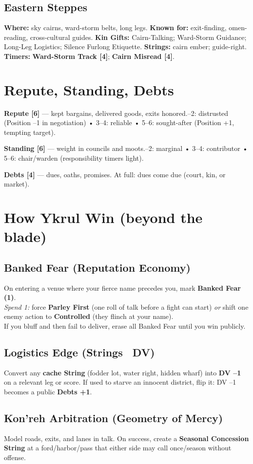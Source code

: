 \documentclass[11pt,letterpaper]{article}
\newcommand{\culture}[1]{\subsection*{#1}}
\newcommand{\timer}[2]{\textbf{#1 [#2]}}
\begin{document}
\culture{Eastern Steppes}
\textbf{Where:} sky cairns, ward-storm belts, long legs.\quad
\textbf{Known for:} exit-finding, omen-reading, cross-cultural guides.\quad
\textbf{Kin Gifts:} Cairn-Talking; Ward-Storm Guidance; Long-Leg Logistics; Silence Furlong Etiquette.\quad
\textbf{Strings:} cairn ember; guide-right.\quad
\textbf{Timers:} \timer{Ward-Storm Track}{4}; \timer{Cairn Misread}{4}.

\section{Repute, Standing, Debts}
\textbf{Repute [6]} --- kept bargains, delivered goods, exits honored.--2: distrusted (Position --1 in negotiation) • 3--4: reliable • 5--6: sought-after (Position +1, tempting target).

\textbf{Standing [6]} --- weight in councils and moots.--2: marginal • 3--4: contributor • 5--6: chair/warden (responsibility timers light).

\textbf{Debts [4]} --- dues, oaths, promises.\quad
At full: dues come due (court, kin, or market).

\section{How Ykrul Win (beyond the blade)}
\subsection*{Banked Fear (Reputation Economy)}
On entering a venue where your fierce name precedes you, mark \textbf{Banked Fear (1)}.\\
\emph{Spend 1:} force \textbf{Parley First} (one roll of talk before a fight can start) \emph{or} shift one enemy action to \textbf{Controlled} (they flinch at your name).\\
If you bluff and then fail to deliver, erase all Banked Fear until you win publicly.

\subsection*{Logistics Edge (Strings \textrightarrow\ DV)}
Convert any \textbf{cache String} (fodder lot, water right, hidden wharf) into \textbf{DV --1} on a relevant leg or score. If used to starve an innocent district, flip it: DV --1 becomes a public \textbf{Debts +1}.

\subsection*{Kon'reh Arbitration (Geometry of Mercy)}
Model roads, exits, and lanes in talk. On success, create a \textbf{Seasonal Concession String} at a ford/harbor/pass that either side may call once/season without offense.
\end{document}
